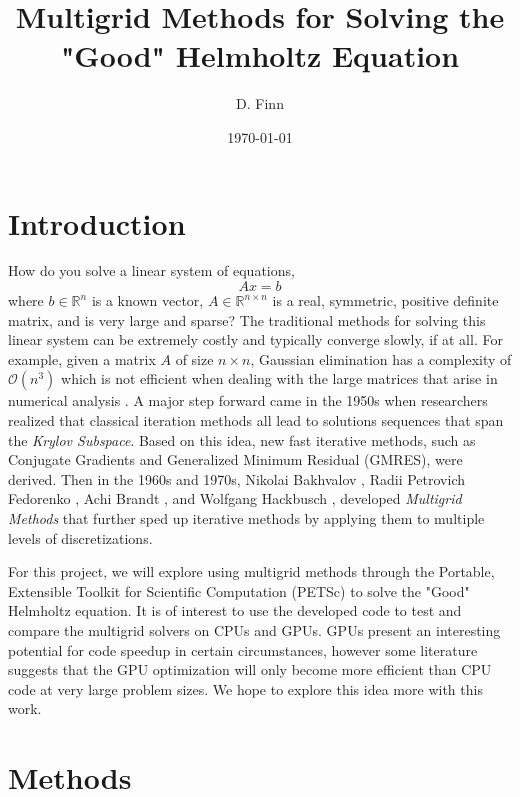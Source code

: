 \documentclass[]{article}
\begin{document}
\title{Multigrid Methods for Solving the "Good" Helmholtz Equation}
\author{D. Finn} 
\date{\today}

\maketitle


\section{Introduction}

How do you solve a linear system of equations,
\begin{equation}
A x = b
\end{equation}
where $b \in \mathbb{R}^n$ is a known vector, $A \in \mathbb{R}^{n \times n}$ is a real, symmetric, positive definite matrix,  and is very large and sparse?  The traditional methods for solving this linear system can be extremely costly and typically converge slowly, if at all.  For example, given a matrix $A$ of size $n \times n$, Gaussian elimination has a complexity of $\mathcal{O} (n^3)$ which is not efficient when dealing with the large matrices that arise in numerical analysis \cite{Ispen1997}.  A major step forward came in the 1950s when researchers realized that classical iteration methods all lead to solutions sequences that span the \textit{Krylov Subspace}.  Based on this idea, new fast iterative methods, such as Conjugate Gradients and Generalized Minimum Residual (GMRES), were derived.  Then in the 1960s and 1970s, Nikolai Bakhvalov \cite{Bakhvalov1966}, Radii Petrovich Fedorenko \cite{Fedorenko1962, Fedorenko1964}, Achi Brandt \cite{Achi1973, Achi1977}, and Wolfgang Hackbusch \cite{Hackbusch1977}, developed \textit{Multigrid Methods} that further sped up iterative methods by applying them to multiple levels of discretizations.  

For this project, we will explore using multigrid methods through the Portable, Extensible Toolkit for Scientific Computation (PETSc) to solve the "Good" Helmholtz equation.  It is of interest to use the developed code to test and compare the multigrid solvers on CPUs and GPUs.  GPUs present an interesting potential for code speedup in certain circumstances, however some literature \cite{May2016} suggests that the GPU optimization will only become more efficient than CPU code at very large problem sizes.   We hope to explore this idea more with this work.

\section{Methods}
\end{document}
